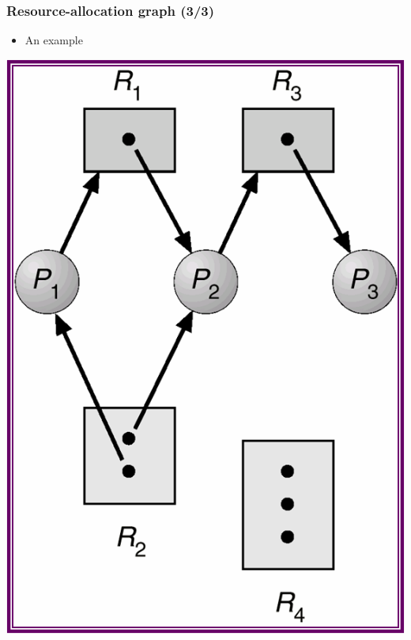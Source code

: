 \documentclass[CJKutf8,xcolor=pdftex,dvipsnames,table]{beamer}
\begin{document}
\begin{CJK*}{UTF8}{song}
  \begin{frame}
  \frametitle{Resource-allocation graph (3/3)} \pause
  \begin{itemize}
  \item{An example} \pause
  \end{itemize}
  \begin{center}
    \includegraphics[scale=0.5]{v6f8-1}
  \end{center}
  \end{frame}
  

\end{CJK*}
\end{document}

